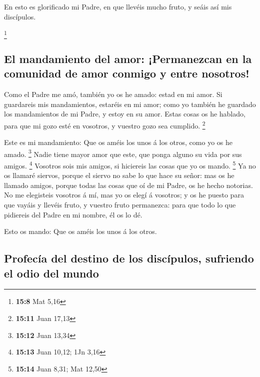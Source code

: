  En esto es glorificado mi Padre, en que llevéis mucho
fruto, y seáis así mis discípulos.

\footnote{\textbf{15:8} Mat 5,16}

\hypertarget{el-mandamiento-del-amor-permanezcan-en-la-comunidad-de-amor-conmigo-y-entre-nosotros}{%
\subsection{El mandamiento del amor: ¡Permanezcan en la comunidad de
amor conmigo y entre
nosotros!}\label{el-mandamiento-del-amor-permanezcan-en-la-comunidad-de-amor-conmigo-y-entre-nosotros}}

 Como el Padre me amó, también yo os he amado: estad en mi
amor.  Si guardareis mis mandamientos, estaréis en mi
amor; como yo también he guardado los mandamientos de mi Padre, y estoy
en su amor.  Estas cosas os he hablado, para que mi gozo
esté en vosotros, y vuestro gozo sea cumplido. \footnote{\textbf{15:11}
  Juan 17,13}

 Este es mi mandamiento: Que os améis los unos á los
otros, como yo os he amado. \footnote{\textbf{15:12} Juan 13,34}
 Nadie tiene mayor amor que este, que ponga alguno su
vida por sus amigos. \footnote{\textbf{15:13} Juan 10,12; 1Jn 3,16}
 Vosotros sois mis amigos, si hiciereis las cosas que yo
os mando. \footnote{\textbf{15:14} Juan 8,31; Mat 12,50} 
Ya no os llamaré siervos, porque el siervo no sabe lo que hace su señor:
mas os he llamado amigos, porque todas las cosas que oí de mi Padre, os
he hecho notorias.  No me elegisteis vosotros á mí, mas
yo os elegí á vosotros; y os he puesto para que vayáis y llevéis fruto,
y vuestro fruto permanezca: para que todo lo que pidiereis del Padre en
mi nombre, él os lo dé.

 Esto os mando: Que os améis los unos á los otros.

\hypertarget{profecuxeda-del-destino-de-los-discuxedpulos-sufriendo-el-odio-del-mundo}{%
\subsection{Profecía del destino de los discípulos, sufriendo el odio
del
mundo}\label{profecuxeda-del-destino-de-los-discuxedpulos-sufriendo-el-odio-del-mundo}}

